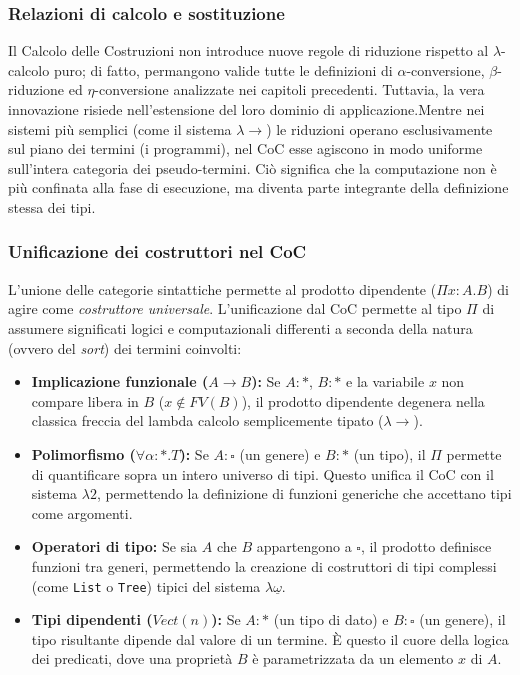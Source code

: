 \subsubsection{Relazioni di calcolo e sostituzione}
Il Calcolo delle Costruzioni non introduce nuove regole di riduzione rispetto al $\lambda$-calcolo puro; di fatto, permangono valide tutte le definizioni di 
$\alpha$-conversione, $\beta$-riduzione ed $\eta$-conversione analizzate nei capitoli precedenti. Tuttavia, la vera innovazione risiede nell'estensione del 
loro dominio di applicazione.Mentre nei sistemi più semplici (come il sistema $\lambda{\to}$) le riduzioni operano esclusivamente sul piano dei termini (i programmi),
nel CoC esse agiscono in modo uniforme sull'intera categoria dei pseudo-termini. Ciò significa che la computazione non è più confinata alla fase di esecuzione, 
ma diventa parte integrante della definizione stessa dei tipi.

\subsubsection{Unificazione dei costruttori nel CoC}
L'unione delle categorie sintattiche permette al prodotto dipendente ($\Pi x : A. B$) di agire come \emph{costruttore universale}. L'unificazione dal CoC permette 
al tipo $\Pi$ di assumere significati logici e computazionali differenti a seconda della natura (ovvero del \textit{sort}) dei termini coinvolti:
\begin{itemize}
    \item \textbf{Implicazione funzionale ($A \to B$):}
        Se $A : \ast$, $B : \ast$ e la variabile $x$ non compare libera in $B$ ($x \notin FV(B)$), 
        il prodotto dipendente degenera nella classica freccia del lambda calcolo semplicemente tipato ($\lambda{\to}$).
    \item \textbf{Polimorfismo ($\forall \alpha : \ast . T$):} 
        Se $A : \square$ (un genere) e $B : \ast$ (un tipo), il $\Pi$ permette di quantificare sopra un intero universo di tipi. 
        Questo unifica il CoC con il sistema $\lambda2$, permettendo la definizione di funzioni generiche che accettano tipi come argomenti.
    \item \textbf{Operatori di tipo:}
        Se sia $A$ che $B$ appartengono a $\square$, il prodotto definisce funzioni tra generi, 
        permettendo la creazione di costruttori di tipi complessi (come \texttt{List} o \texttt{Tree}) 
        tipici del sistema $\lambda\underline{\omega}$.
    \item \textbf{Tipi dipendenti ($Vect(n)$):}
        Se $A : \ast$ (un tipo di dato) e $B : \square$ (un genere), il tipo risultante dipende dal valore di un termine. 
        È questo il cuore della logica dei predicati, dove una proprietà $B$ è parametrizzata da un elemento $x$ di $A$.
\end{itemize}

